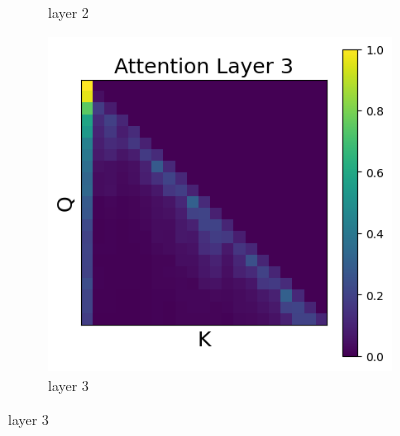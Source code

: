 \documentclass[11pt]{article}
\begin{document}
\begin{figure}[t]
\begin{subfigure}[t]{0.24\textwidth}
    \caption{layer 2}
  \end{subfigure}\hfill
  \begin{subfigure}[t]{0.24\textwidth}
    \centering
    \includegraphics[width=1.4\columnwidth]{figures/no_intervention/layer_3.png}
    \caption{layer 3}
  \end{subfigure}\hfill


\end{figure}
\end{document}
